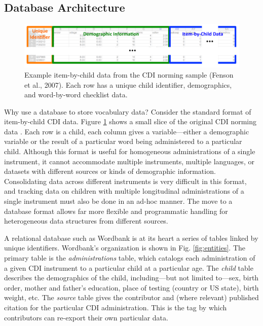 \documentclass[man,noapacite]{apa2}
\begin{document}
\subsection{Database Architecture}

\begin{figure}[t]
\centering
\includegraphics[width=5in]{figures/itembychild.pdf}
\caption{\label{fig:data} Example item-by-child data from the CDI norming sample (Fenson et al., 2007). Each row has a unique child identifier, demographics, and word-by-word checklist data. }
\end{figure}

Why use a database to store vocabulary data? Consider the standard format of item-by-child CDI data. Figure \ref{fig:data} shows a small slice of the original CDI norming data \cite{fenson1994,fenson2007}. Each row is a child, each column gives a variable---either a demographic variable or the result of a particular word being administered to a particular child. Although this format is useful for homogeneous administrations of a single instrument, it cannot accommodate multiple instruments, multiple languages, or datasets with different sources or kinds of demographic information. Consolidating data across different instruments is very difficult in this format, and tracking data on children with multiple longitudinal administrations of a single instrument must also be done in an ad-hoc manner. The move to a database format allows far more flexible and programmatic handling for heterogeneous data structures from different sources. 

A relational database such as Wordbank is at its heart a series of tables linked by unique identifiers. Wordbank's organization is shown in Fig. \ref{fig:entities}. The primary table is the \emph{administrations} table, which catalogs each administration of a given CDI instrument to a particular child at a particular age. The \emph{child} table describes the demographics of the child, including---but not limited to---sex, birth order, mother and father's education, place of testing (country or US state), birth weight, etc. The \emph{source} table gives the contributor and (where relevant) published citation for the particular CDI administration. This is the tag by which contributors can re-export their own particular data.
\end{document}
